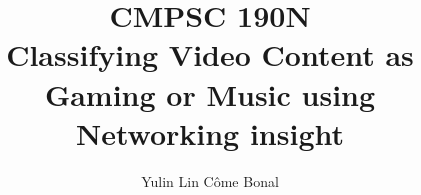 \documentclass[10pt,twocolumn]{confpaper}
\date{}
\title{
{CMPSC 190N\\ Classifying Video Content as Gaming or Music using Networking insight}}
\author{
{Yulin Lin Côme Bonal}
}
\begin{document}
\maketitle
\thispagestyle{empty}


\begin{sloppypar}












% 

\label{lastpage}

\end{sloppypar}

\vspace{-0.01in}
\pagebreak
\small
\setlength{\parskip}{-1pt}
\setlength{\itemsep}{-1pt}
\balance



{%
}

%
\end{document}
